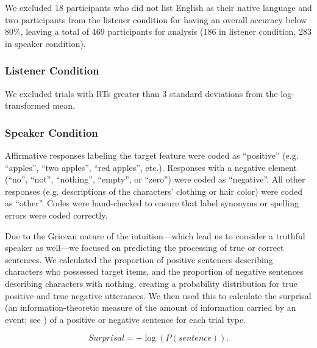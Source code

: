 \documentclass[man, noapacite]{apa2}
\begin{document}
We excluded 18 participants who did not list English as their native language and two participants from the listener condition for having an overall accuracy below 80\%, leaving a total of 469 participants for analysis (186 in listener condition, 283 in speaker condition). 

\subsubsection{Listener Condition}
We excluded trials with RTs greater than 3 standard deviations from the log-transformed mean.  

\subsubsection{Speaker Condition}
Affirmative responses labeling the target feature were coded as ``positive'' (e.g. ``apples'', ``two apples'', ``red apples'', etc.).  Responses with a negative element (``no'', ``not'', ``nothing'', ``empty'', or ``zero'') were coded as ``negative''.  All other responses (e.g. descriptions of the characters' clothing or hair color) were coded as ``other''.  Codes were hand-checked to ensure that label synonyms or spelling errors were coded correctly.  

Due to the Gricean nature of the intuition---which lead us to consider a truthful speaker as well---we focused on predicting the processing of true or correct sentences.   We calculated the proportion of positive sentences describing characters who possessed target items, and the proportion of negative sentences describing characters with nothing, creating a probability distribution for true positive and true negative utterances.  We then used this to calculate the surprisal (an information-theoretic measure of the amount of information carried by an event; see \cite{levy2008}) of a positive or negative sentence for each trial type.  

\begin{equation}\label{eq:surprise}
Surprisal = -\log(P(sentence)).
\end{equation}

\end{document}
